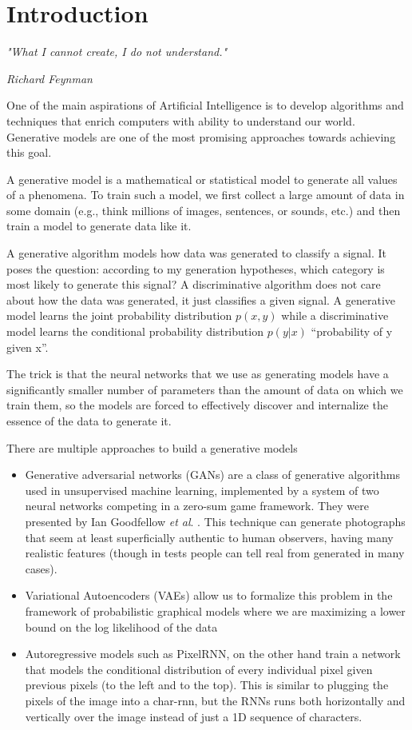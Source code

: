 \chapter{Introduction}\label{ch:introduction}

\epigraph{\normalsize\textit{ "What I cannot create, I do not understand."}}{\normalsize\textit{ Richard Feynman}}

One of the main aspirations of Artificial Intelligence is to develop algorithms and techniques that enrich computers with ability to understand our world. Generative models are one of the most promising approaches towards achieving this goal.\par\bigskip
A generative model is a mathematical or statistical model to generate all values of a phenomena. To train such a model, we first collect a large amount of data in some domain (e.g., think millions of images, sentences, or sounds, etc.) and then train a model to generate data like it.\par\bigskip
A generative algorithm models how data was generated to classify a signal. It poses the question: according to my generation hypotheses, which category is most likely to generate this signal? A discriminative algorithm does not care about how the data was generated, it just classifies a given signal. A generative model learns the joint probability distribution $p(x,y)$ while a discriminative model learns the conditional probability distribution $p(y|x)$ “probability of y given x”.\par\bigskip
The trick is that the neural networks that we use as generating models have a significantly smaller number of parameters than the amount of data on which we train them, so the models are forced to effectively discover and internalize the essence of the data to generate it.\par\bigskip
There are multiple approaches to build a generative models
\begin{itemize}
  \item Generative adversarial networks (GANs) are a class of generative algorithms used in unsupervised machine learning, implemented by a system of two neural networks competing in a zero-sum game framework. They were presented by Ian Goodfellow \textit{et al}. \cite{gan}. This technique can generate photographs that seem at least superficially authentic to human observers, having many realistic features (though in tests people can tell real from generated in many cases).
  \item Variational Autoencoders (VAEs) allow us to formalize this problem in the framework of probabilistic graphical models where we are maximizing a lower bound on the log likelihood of the data
  \item Autoregressive models such as PixelRNN, on the other hand train a network that models the conditional distribution of every individual pixel given previous pixels (to the left and to the top). This is similar to plugging the pixels of the image into a char-rnn, but the RNNs runs both horizontally and vertically over the image instead of just a 1D sequence of characters.
\end{itemize} \par
